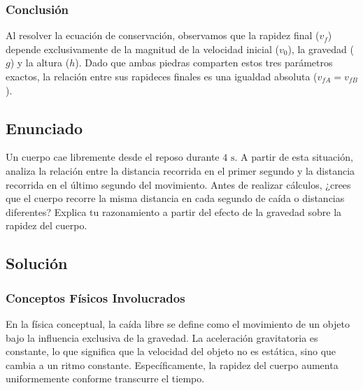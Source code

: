 \documentclass[12pt, a4paper]{article}
\begin{document}
\subsubsection*{Conclusión}

Al resolver la ecuación de conservación, observamos que la rapidez final ($v_f$) depende exclusivamente de la magnitud de la velocidad inicial ($v_0$), la gravedad ($g$) y la altura ($h$). Dado que ambas piedras comparten estos tres parámetros exactos, la relación entre sus rapideces finales es una igualdad absoluta ($v_{fA} = v_{fB}$).

\newpage

\subsection*{Enunciado}

Un cuerpo cae libremente desde el reposo durante $4 \text{ s}$. A partir de esta situación, analiza la relación entre la distancia recorrida en el primer segundo y la distancia recorrida en el último segundo del movimiento. Antes de realizar cálculos, ¿crees que el cuerpo recorre la misma distancia en cada segundo de caída o distancias diferentes? Explica tu razonamiento a partir del efecto de la gravedad sobre la rapidez del cuerpo.

\vspace{0.5cm}

\begin{center}
\end{center}

\subsection*{Solución}

\subsubsection*{Conceptos Físicos Involucrados}

En la física conceptual, la caída libre se define como el movimiento de un objeto bajo la influencia exclusiva de la gravedad. La aceleración gravitatoria es constante, lo que significa que la velocidad del objeto no es estática, sino que cambia a un ritmo constante. Específicamente, la rapidez del cuerpo aumenta uniformemente conforme transcurre el tiempo.
\end{document}

